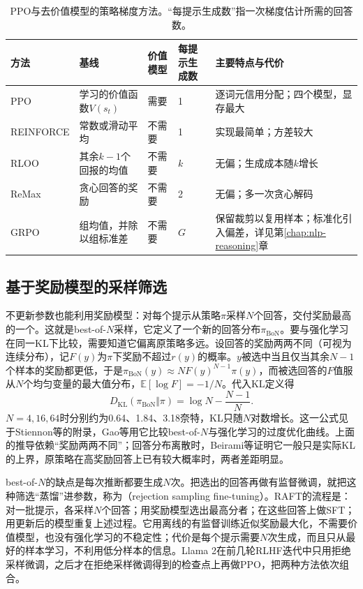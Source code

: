 \begin{table}[htbp]
  \centering
  \small
  \caption{PPO与去价值模型的策略梯度方法。“每提示生成数”指一次梯度估计所需的回答数。}
  \label{tab:nlp-align-critic-free}
  \begin{tabularx}{\linewidth}{@{}lp{30mm}p{18mm}p{20mm}X@{}}
    \toprule
    方法 & 基线 & 价值模型 & 每提示生成数 & 主要特点与代价\\
    \midrule
    PPO & 学习的价值函数$V(s_t)$ & 需要 & 1 & 逐词元信用分配；四个模型，显存最大\\
    REINFORCE & 常数或滑动平均 & 不需要 & 1 & 实现最简单；方差较大\\
    RLOO & 其余$k-1$个回报的均值 & 不需要 & $k$ & 无偏；生成成本随$k$增长\\
    ReMax & 贪心回答的奖励 & 不需要 & 2 & 无偏；多一次贪心解码\\
    GRPO & 组均值，并除以组标准差 & 不需要 & $G$ & 保留裁剪以复用样本；标准化引入偏差，详见第\ref{chap:nlp-reasoning}章\\
    \bottomrule
  \end{tabularx}
\end{table}

\subsection{基于奖励模型的采样筛选}
\label{sec:nlp-align-best-of-n}

不更新参数也能利用奖励模型：对每个提示从策略$\pi$采样$N$个回答，交付奖励最高的一个。这就是best-of-$N$采样，它定义了一个新的回答分布$\pi_{\mathrm{BoN}}$。要与强化学习在同一KL下比较，需要知道它偏离原策略多远。设回答的奖励两两不同（可视为连续分布），记$F(y)$为$\pi$下奖励不超过$r(y)$的概率。$y$被选中当且仅当其余$N-1$个样本的奖励都更低，于是$\pi_{\mathrm{BoN}}(y)\approx N F(y)^{N-1}\pi(y)$，而被选回答的$F$值服从$N$个均匀变量的最大值分布，$\mathbb E[\log F]=-1/N$。代入KL定义得
\begin{equation}
\label{eq:nlp-align-bon-kl}
 D_{\mathrm{KL}}(\pi_{\mathrm{BoN}}\Vert\pi)=\log N-\frac{N-1}{N}.
\end{equation}
$N=4,16,64$时分别约为0.64、1.84、3.18奈特，KL只随$N$对数增长。这一公式见于Stiennon等的附录\cite{nlp-align-stiennon2020}，Gao等用它比较best-of-$N$与强化学习的过度优化曲线\cite{gao2022overoptimization}。上面的推导依赖“奖励两两不同”；回答分布离散时，Beirami等证明它一般只是实际KL的上界，原策略在高奖励回答上已有较大概率时，两者差距明显。

best-of-$N$的缺点是每次推断都要生成$N$次。把选出的回答再做有监督微调，就把这种筛选“蒸馏”进参数，称为（rejection sampling fine-tuning）。RAFT的流程是：对一批提示，各采样$N$个回答；用奖励模型选出最高分者；在这些回答上做SFT；用更新后的模型重复上述过程。它用离线的有监督训练近似奖励最大化，不需要价值模型，也没有强化学习的不稳定性；代价是每个提示需要$N$次生成，而且只从最好的样本学习，不利用低分样本的信息。Llama 2在前几轮RLHF迭代中只用拒绝采样微调，之后才在拒绝采样微调得到的检查点上再做PPO，把两种方法依次组合。

